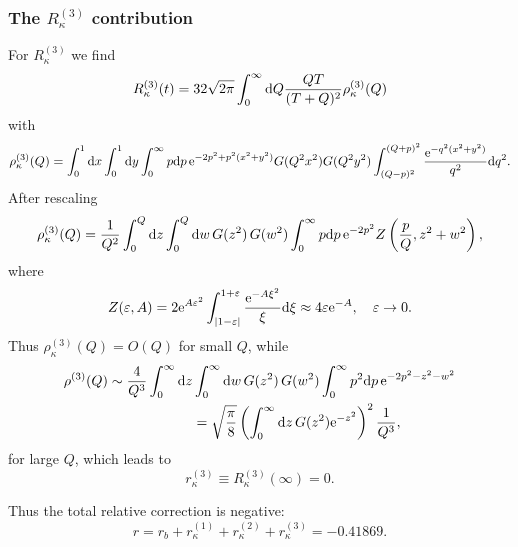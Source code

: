 \documentclass[preprint]{ptephy_v1}%
\newcommand{\rme}{{\rm e}}
\newcommand{\rmd}{{\rm d}}
\begin{document}
\subsubsection{The $R_\kappa^{(3)}$ contribution}
For $R_\kappa^{(3)}$ we find
\begin{equation}
R_\kappa^{(3)}(t)=32\sqrt{2\pi}\int_0^\infty\rmd Q\frac{QT}{(T+Q)^2}
\rho^{(3)}_\kappa(Q)
\end{equation}
with
\begin{equation}
\rho^{(3)}_\kappa(Q)=\int_0^1\rmd x \int_0^1\rmd y
\int_0^\infty p\rmd p\, \rme^{-2p^2+p^2(x^2+y^2)}G(Q^2x^2)G(Q^2y^2)
\int_{(Q-p)^2}^{(Q+p)^2}\frac{\rme^{-q^2(x^2+y^2)}}{q^2} \rmd q^2.
\end{equation}
After rescaling
\begin{equation}
\rho^{(3)}_\kappa(Q)=\frac{1}{Q^2}\int_0^Q\rmd z \int_0^Q\rmd w\,
G(z^2)\, G(w^2)\int_0^\infty p\rmd p\, \rme^{-2p^2}
Z\left(\frac{p}{Q},z^2+w^2\right),
\end{equation}
where
\begin{equation}
Z(\varepsilon,A)=2\rme^{A\varepsilon^2}\int_{|1-\varepsilon|}^{1+\varepsilon}
\frac{\rme^{-A\xi^2}}{\xi}\rmd \xi
\approx 4\varepsilon\rme^{-A}, \quad \varepsilon\rightarrow 0.
\end{equation}
Thus $\rho_\kappa^{(3)}(Q) = O(Q)$ for small $Q$, while 
\begin{equation}
\begin{split}
\rho^{(3)}(Q)\sim\frac{4}{Q^3}\int_0^\infty\rmd z &\int_0^\infty\rmd w\,
G(z^2)\, G(w^2)\int_0^\infty p^2\rmd p\, \rme^{-2p^2-z^2-w^2}\\
&=\sqrt{\frac{\pi}{8}}\left(\int_0^\infty\rmd z\, G(z^2)\rme^{-z^2}\right)^2
\frac{1}{Q^3},
\end{split}
\end{equation}
 for large $Q$, which leads to 
\begin{equation}
r^{(3)}_\kappa \equiv R^{(3)}_\kappa(\infty)=0 . 
\end{equation}

Thus the total relative correction is negative:
\begin{equation}
r=r_b+r^{(1)}_\kappa+r^{(2)}_\kappa+r^{(3)}_\kappa=
-0.41869.
\end{equation}




\end{document}
